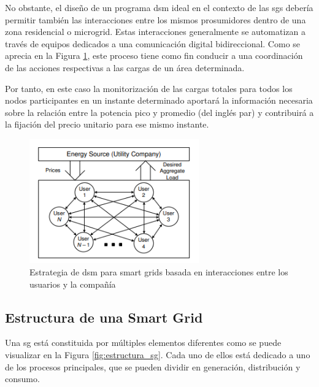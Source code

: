 \vspace{3mm}

No obstante, el diseño de un programa \gls{dsm} ideal en el contexto de las \gls{sg}s debería permitir también las interacciones entre los mismos prosumidores dentro de una zona residencial o microgrid. Estas interacciones generalmente se automatizan a través de equipos dedicados a una comunicación digital bidireccional. Como se aprecia en la Figura \ref{fig:dsm2}, este proceso tiene como fin conducir a una coordinación de las acciones respectivas a las cargas de un área determinada. 

\vspace{3mm}

Por tanto, en este caso la monitorización de las cargas totales para todos los nodos participantes en un instante determinado aportará la información necesaria sobre la relación entre la potencia pico y promedio (del inglés \gls{par}) y contribuirá a la fijación del precio unitario para ese mismo instante. \cite{pricing} 

\begin{figure}[h!]
  \centering
  \includegraphics[width=0.65\textwidth]{img/teoria/dsm2.png}
  \caption{Estrategia de \acrshort{dsm} para smart grids basada en interacciones entre los usuarios y la compañía \cite{pricing}}
  \label{fig:dsm2}
\end{figure}


\subsection{Estructura de una Smart Grid}

Una \gls{sg} está constituida por múltiples elementos diferentes como se puede visualizar en la Figura \ref{fig:estructura_sg}. Cada uno de ellos está dedicado a uno de los procesos principales, que se pueden dividir en generación, distribución y consumo. \cite{smartgrid_overview}

